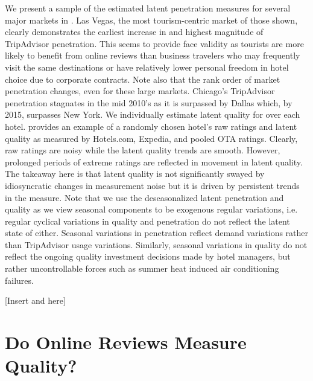 \documentclass[mksc,blindrev]{informs3} %
\begin{document}
We present a sample of the estimated latent penetration measures for several major markets in . Las Vegas, the most tourism-centric market of those shown, clearly demonstrates the earliest increase in and highest magnitude of TripAdvisor penetration. This seems to provide face validity as tourists are more likely to benefit from online reviews than business travelers who may frequently visit the same destinations or have relatively lower personal freedom in hotel choice due to corporate contracts. Note also that the rank order of market penetration changes, even for these large markets. Chicago's TripAdvisor penetration stagnates in the mid 2010's as it is surpassed by Dallas which, by 2015, surpasses New York. We individually estimate latent quality for over each hotel.  provides an example of a randomly chosen hotel's raw ratings and latent quality as measured by Hotels.com, Expedia, and pooled OTA ratings. Clearly, raw ratings are noisy while the latent quality trends are smooth. However, prolonged periods of extreme ratings are reflected in movement in latent quality. The takeaway here is that latent quality is not significantly swayed by idiosyncratic changes in measurement noise but it is driven by persistent trends in the measure. Note that we use the deseasonalized latent penetration and quality as we view seasonal components to be exogenous regular variations, i.e. regular cyclical variations in quality and penetration do not reflect the latent state of either. Seasonal variations in penetration reflect demand variations rather than TripAdvisor usage variations. Similarly, seasonal variations in quality do not reflect the ongoing quality investment decisions made by hotel managers, but rather uncontrollable forces such as summer heat induced air conditioning failures.

[Insert  and  here]

\section{Do Online Reviews Measure Quality?} \label{sec:quality}
\end{document}
